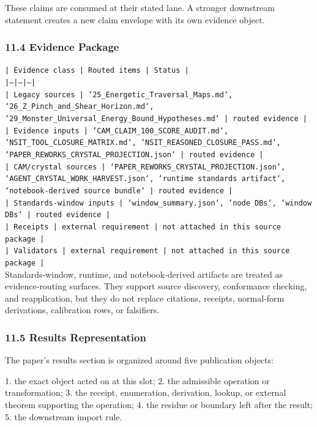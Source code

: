 \documentclass[11pt]{article}
\begin{document}
These claims are consumed at their stated lane. A stronger downstream statement
creates a new claim envelope with its own evidence object.

\subsubsection*{11.4 Evidence Package}

\noindent\texttt{| Evidence class | Routed items | Status |}\\
\noindent\texttt{|---|---|---|}\\
\noindent\texttt{| Legacy sources | `25\_Energetic\_Traversal\_Maps.md`, `26\_Z\_Pinch\_and\_Shear\_Horizon.md`, `29\_Monster\_Universal\_Energy\_Bound\_Hypotheses.md` | routed evidence |}\\
\noindent\texttt{| Evidence inputs | `CAM\_CLAIM\_100\_SCORE\_AUDIT.md`, `NSIT\_TOOL\_CLOSURE\_MATRIX.md`, `NSIT\_REASONED\_CLOSURE\_PASS.md`, `PAPER\_REWORKS\_CRYSTAL\_PROJECTION.json` | routed evidence |}\\
\noindent\texttt{| CAM/crystal sources | `PAPER\_REWORKS\_CRYSTAL\_PROJECTION.json`, `AGENT\_CRYSTAL\_WORK\_HARVEST.json`, `runtime standards artifact`, `notebook-derived source bundle` | routed evidence |}\\
\noindent\texttt{| Standards-window inputs | `window\_summary.json`, `node DBs`, `window DBs` | routed evidence |}\\
\noindent\texttt{| Receipts | external requirement | not attached in this source package |}\\
\noindent\texttt{| Validators | external requirement | not attached in this source package |}\\

Standards-window, runtime, and notebook-derived artifacts are treated
as evidence-routing surfaces. They support source discovery, conformance
checking, and reapplication, but they do not replace citations, receipts,
normal-form derivations, calibration rows, or falsifiers.

\subsubsection*{11.5 Results Representation}

The paper's results section is organized around five publication objects:

1. the exact object acted on at this slot;
2. the admissible operation or transformation;
3. the receipt, enumeration, derivation, lookup, or external theorem supporting
   the operation;
4. the residue or boundary left after the result;
5. the downstream import rule.
\end{document}
